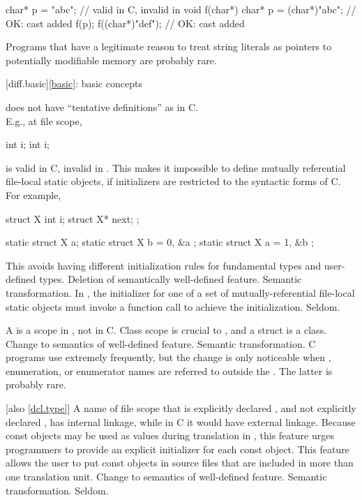\begin{codeblock}
char* p = "abc";                // valid in C, invalid in \Cpp{}
void f(char*) {
  char* p = (char*)"abc";       // OK: cast added
  f(p);
  f((char*)"def");              // OK: cast added
}
\end{codeblock}

\howwide
Programs that have a legitimate reason to treat string literals
as pointers to potentially modifiable memory are probably rare.

[diff.basic]{\ref{basic}: basic concepts}

\change \Cpp{} does not have ``tentative definitions'' as in C.\\
E.g., at file scope,

\begin{codeblock}
int i;
int i;
\end{codeblock}

is valid in C, invalid in \Cpp{}.
This makes it impossible to define
mutually referential file-local static objects, if initializers are
restricted to the syntactic forms of C\@.
For example,

\begin{codeblock}
struct X { int i; struct X* next; };

static struct X a;
static struct X b = { 0, &a };
static struct X a = { 1, &b };
\end{codeblock}

\rationale
This avoids having different initialization rules for
fundamental types and user-defined types.
\effect
Deletion of semantically well-defined feature.
\difficulty
Semantic transformation.
In \Cpp{}, the initializer for one of a set of
mutually-referential file-local static objects must invoke a function
call to achieve the initialization.
\howwide
Seldom.

\change A  is a scope in \Cpp{}, not in C.
\rationale
Class scope is crucial to \Cpp{}, and a struct is a class.
\effect
Change to semantics of well-defined feature.
\difficulty
Semantic transformation.
\howwide
C programs use  extremely frequently, but the
change is only noticeable when , enumeration, or enumerator
names are referred to outside the .
The latter is probably rare.

 [also \ref{dcl.type}]
\change A name of file scope that is explicitly declared , and not explicitly
declared , has internal linkage, while in C it would have external linkage.
\rationale
Because const objects may be used as values during translation in
\Cpp{}, this feature urges programmers to provide an explicit initializer
for each const object.
This feature allows the user to put const objects in source files that are included
in more than one translation unit.
\effect
Change to semantics of well-defined feature.
\difficulty
Semantic transformation.
\howwide
Seldom.

